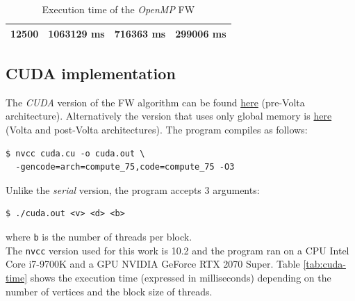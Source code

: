\begin{table}[h!]
\begin{tabular}{|r|r|r|r|}
12500                                                                                  & 1063129 ms                                                                                     & 716363 ms                                                                                       & 299006 ms                                                                                       \\ \hline
\end{tabular}
\caption{Execution time of the \emph{OpenMP} FW}                                                                                                                                            
\label{tab:omp-time}
\end{table}

\subsection{CUDA implementation}\label{cudaimpl}
The \emph{CUDA} version of the FW algorithm can be found \href{https://github.com/firaja/Parallel-FloydWarshall/blob/master/cuda.cu}{here} (pre-Volta architecture). Alternatively the version 
that uses only global memory is \href{https://github.com/firaja/Parallel-FloydWarshall/blob/master/cuda2.cu}{here} (Volta and post-Volta architectures).
The program compiles as follows:
\begin{lstlisting}[basicstyle=\footnotesize\ttfamily]
$ nvcc cuda.cu -o cuda.out \
  -gencode=arch=compute_75,code=compute_75 -O3
\end{lstlisting}
Unlike the \emph{serial} version, the program accepts 3 arguments:
\begin{lstlisting}[basicstyle=\footnotesize\ttfamily]
$ ./cuda.out <v> <d> <b>
\end{lstlisting}
where \texttt{b} is the number of threads per block. \\
The \texttt{nvcc} version used for this work is 10.2 and the program ran on a CPU Intel Core i7-9700K and a GPU NVIDIA GeForce RTX 2070 Super.
Table \ref*{tab:cuda-time} shows the execution time (expressed in milliseconds) depending on the number of vertices and the block size of threads.

